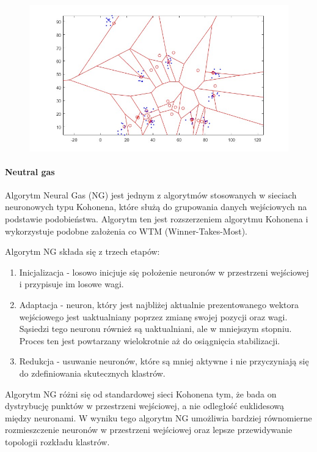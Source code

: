 \documentclass[11pt]{article}
\providecommand{\tightlist}{%
      \setlength{\itemsep}{0pt}\setlength{\parskip}{0pt}}
\begin{document}
\begin{figure}[h!]
  \includegraphics{screeny/WTM_seq/WTM_seq_10_groups/WTM_seq_Areas.jpg}
\end{figure}

\hypertarget{neutral-gas}{%
\paragraph{Neutral gas}\label{neutral-gas}}

Algorytm Neural Gas (NG) jest jednym z algorytmów stosowanych w sieciach
neuronowych typu Kohonena, które służą do grupowania danych wejściowych
na podstawie podobieństwa. Algorytm ten jest rozszerzeniem algorytmu
Kohonena i wykorzystuje podobne założenia co WTM (Winner-Takes-Most).

Algorytm NG składa się z trzech etapów:

\begin{enumerate}
\def\labelenumi{\arabic{enumi}.}
\tightlist
\item
  Inicjalizacja - losowo inicjuje się położenie neuronów w przestrzeni
  wejściowej i przypisuje im losowe wagi.
\item
  Adaptacja - neuron, który jest najbliżej aktualnie prezentowanego
  wektora wejściowego jest uaktualniany poprzez zmianę swojej pozycji
  oraz wagi. Sąsiedzi tego neuronu również są uaktualniani, ale w
  mniejszym stopniu. Proces ten jest powtarzany wielokrotnie aż do
  osiągnięcia stabilizacji.
\item
  Redukcja - usuwanie neuronów, które są mniej aktywne i nie
  przyczyniają się do zdefiniowania skutecznych klastrów.
\end{enumerate}

Algorytm NG różni się od standardowej sieci Kohonena tym, że bada on
dystrybucję punktów w przestrzeni wejściowej, a nie odległość
euklidesową między neuronami. W wyniku tego algorytm NG umożliwia
bardziej równomierne rozmieszczenie neuronów w przestrzeni wejściowej
oraz lepsze przewidywanie topologii rozkładu klastrów.
\end{document}
